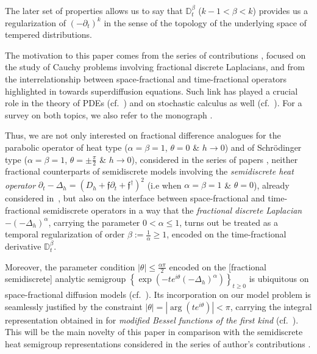 \documentclass{elsarticle}
\newcommand{\f}{{\mathfrak f}}
\begin{document}
The later set of properties allows us to say that $\mathbb{D}_{t}^\beta$ ($k-1<\beta <k$) provides us a regularization of $(-\partial_t)^k$ in the sense of the topology of the underlying space of tempered distributions.

The motivation to this paper comes from the series of contributions \cite{CiaurriGRTV18,LizamaRoncal18,GLizamaM21}, focused on the study of Cauchy problems involving fractional discrete Laplacians, and from the interrelationship between space-fractional and time-fractional operators highlighted in \cite{CLRV15} towards superdiffusion equations. Such link has played a crucial role in the theory of PDEs (cf.~\cite{KL02,KL12}) and on stochastic calculus as well (cf.~\cite{BMN09}). For a survey on both topics, we also refer to the monograph \cite{MS12}.

Thus, we are not only interested on fractional difference analogues for the parabolic operator of heat type ($\alpha=\beta=1$, $\theta=0$ \& $h\rightarrow 0$) and of Schr\"odinger type ($\alpha=\beta=1$, $\theta=\pm\frac{\pi}{2}$ \& $h\rightarrow 0$), considered in the series of papers \cite{CKS05,B06,CSV07,AKTT16,A18,BCBM20}, neither fractional counterparts of semidiscrete models involving the {\it semidiscrete heat operator} $\partial_t-\Delta_h=(D_h+\f\partial_t+\f^\dagger)^2$ (i.e when $\alpha=\beta=1$ \& $\theta=0$), already considered in~\cite{BBRS14},
but also on the interface between space-fractional and time-fractional semidiscrete operators in a way that the {\it fractional discrete Laplacian} $-(-\Delta_h)^\alpha$, carrying the parameter $0<\alpha\leq 1$, turns out be treated as a temporal regularization of order $\beta:=\frac{1}{\alpha}\geq 1$, encoded on the time-fractional derivative $\mathbb{D}_t^\beta$. 

Moreover, the parameter condition $|\theta|\leq \frac{\alpha\pi}{2}$ encoded on the [fractional semidiscrete] analytic semigroup $\displaystyle \left\{\exp(-te^{i\theta}(-\Delta_h)^\alpha)\right\}_{t\geq 0}$ is ubiquitous on space-fractional diffusion models (cf.~\cite{Mainardi01}). Its incorporation on our model problem is seamlessly justified by the constraint $|\theta|=|\arg(te^{i\theta})|<\pi$, carrying the integral representation obtained in \cite[p. 458, eq.~(21.35)]{F19} for {\it modified Bessel functions of the first kind} (cf.~\cite[Subsection 2.1 \& Subsection 3.1]{LizamaRoncal18}). This will be the main novelty of this paper in comparison with the semidiscrete heat semigroup representations considered in the series of author's contributions \cite{F19,F19b,F20}.
\end{document}
